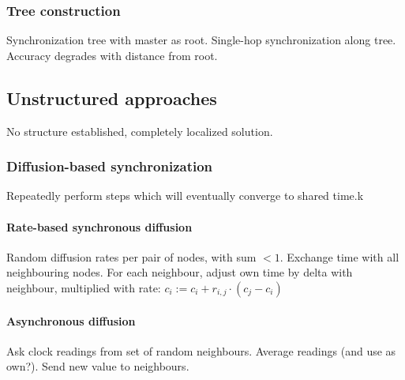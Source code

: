 \subsubsection{Tree construction}

Synchronization tree with master as root. Single-hop synchronization along
tree. Accuracy degrades with distance from root.

\subsection{Unstructured approaches}

No structure established, completely localized solution.

\subsubsection{Diffusion-based synchronization}

Repeatedly perform steps which will eventually converge to shared time.k

\paragraph{Rate-based synchronous diffusion}

Random diffusion rates per pair of nodes, with sum $< 1$. Exchange time with
all neighbouring nodes. For each neighbour, adjust own time by delta with
neighbour, multiplied with rate: $c_i := c_i + r_{i, j} \cdot (c_j - c_i)$

\paragraph{Asynchronous diffusion}

Ask clock readings from set of random neighbours. Average readings (and use as
own?).  Send new value to neighbours.
